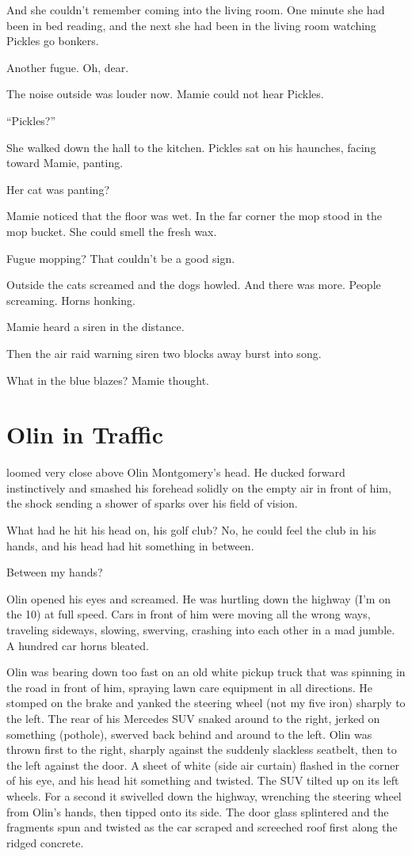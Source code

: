 And she couldn’t remember coming into the living room. One minute she had been in bed reading, and the next she had been in the living room watching Pickles go bonkers.

Another fugue. Oh, dear.

The noise outside was louder now. Mamie could not hear Pickles.

“Pickles?”

She walked down the hall to the kitchen. Pickles sat on his haunches, facing toward Mamie, panting.

Her cat was panting?

Mamie noticed that the floor was wet. In the far corner the mop stood in the mop bucket. She could smell the fresh wax.

Fugue mopping? That couldn’t be a good sign.

Outside the cats screamed and the dogs howled. And there was more. People screaming. Horns honking.

Mamie heard a siren in the distance.

Then the air raid warning siren two blocks away burst into song.

What in the blue blazes? Mamie thought.



\chapter{Olin in Traffic}

 loomed very close above Olin Montgomery’s head. He ducked forward instinctively and smashed his forehead solidly on the empty air in front of him, the shock sending a shower of sparks over his field of vision.

What had he hit his head on, his golf club? No, he could feel the club in his hands, and his head had hit something in between.

Between my hands?

Olin opened his eyes and screamed. He was hurtling down the highway (I’m on the 10) at full speed. Cars in front of him were moving all the wrong ways, traveling sideways, slowing, swerving, crashing into each other in a mad jumble. A hundred car horns bleated.

Olin was bearing down too fast on an old white pickup truck that was spinning in the road in front of him, spraying lawn care equipment in all directions. He stomped on the brake and yanked the steering wheel (not my five iron) sharply to the left. The rear of his Mercedes SUV snaked around to the right, jerked on something (pothole), swerved back behind and around to the left. Olin was thrown first to the right, sharply against the suddenly slackless seatbelt, then to the left against the door. A sheet of white (side air curtain) flashed in the corner of his eye, and his head hit something and twisted. The SUV tilted up on its left wheels. For a second it swivelled down the highway, wrenching the steering wheel from Olin’s hands, then tipped onto its side. The door glass splintered and the fragments spun and twisted as the car scraped and screeched roof first along the ridged concrete.

